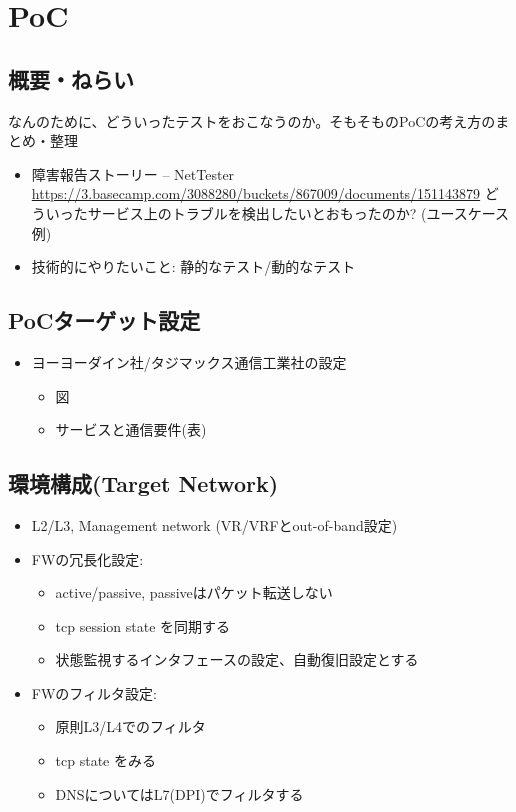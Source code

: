 
\chapter{PoC}

\section{概要・ねらい}

なんのために、どういったテストをおこなうのか。そもそものPoCの考え方のまとめ・整理

\begin{itemize}
 \item 障害報告ストーリー – NetTester \url{https://3.basecamp.com/3088280/buckets/867009/documents/151143879}
       どういったサービス上のトラブルを検出したいとおもったのか? (ユースケース例)
 \item 技術的にやりたいこと:  静的なテスト/動的なテスト
\end{itemize}

\section{PoCターゲット設定}

 \begin{itemize}
  \item ヨーヨーダイン社/タジマックス通信工業社の設定
        \begin{itemize}
         \item 図
         \item サービスと通信要件(表)
        \end{itemize}
 \end{itemize}

\section{環境構成(Target Network)}

\begin{itemize}
 \item L2/L3, Management network (VR/VRFとout-of-band設定)
 \item FWの冗長化設定:
       \begin{itemize}
        \item active/passive, passiveはパケット転送しない
        \item tcp session state を同期する
        \item 状態監視するインタフェースの設定、自動復旧設定とする
       \end{itemize}
 \item FWのフィルタ設定:
       \begin{itemize}
        \item 原則L3/L4でのフィルタ
        \item tcp state をみる
        \item DNSについてはL7(DPI)でフィルタする
       \end{itemize}
\end{itemize}

